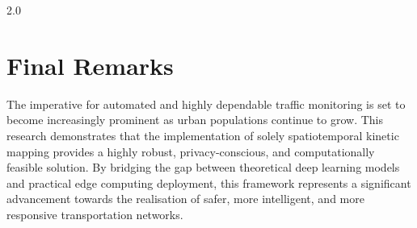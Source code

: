 \begin{spacing}{2.0}
\section{Final Remarks}
The imperative for automated and highly dependable traffic monitoring is set to become increasingly prominent as urban populations continue to grow. This research demonstrates that the implementation of solely spatiotemporal kinetic mapping provides a highly robust, privacy-conscious, and computationally feasible solution. By bridging the gap between theoretical deep learning models and practical edge computing deployment, this framework represents a significant advancement towards the realisation of safer, more intelligent, and more responsive transportation networks.
\end{spacing}
\newpage
